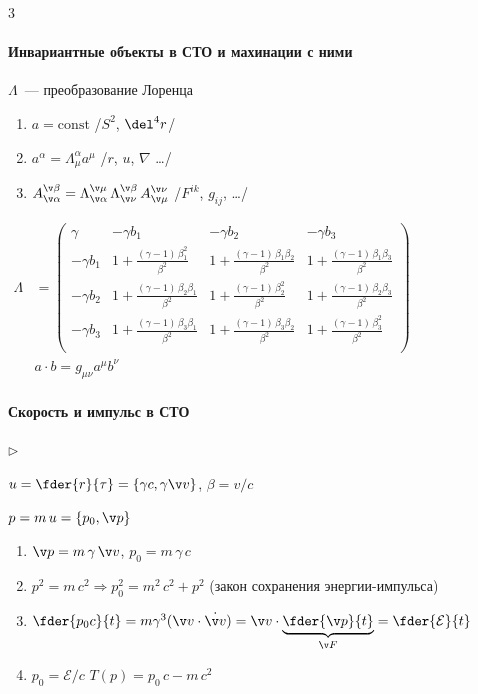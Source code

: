 \documentclass{trchesh}
\newenvironment{facts}{\begin{list}{$\triangleright$}{}}{\end{list}}
\begin{document}
\begin{multicols*}{3}
\paragraph{Инвариантные объекты в СТО и махинации с ними\underdev}
$\Lambda$~--- преобразование Лоренца
\begin{enumerate}
  \item $a = \mathrm{const}$ \hfill /$S^2$, $\del^4r$/
  \item $a^\alpha = \Lambda^\alpha_\mu a^\mu$ \hfill /$r$, $u$, $\nabla$ \dots/
  \item $A_{\v \alpha}^{\v \beta} = \Lambda_{\v \alpha}^{\v \mu} \, \Lambda_{\v \nu}^{\v \beta}\,
    A_{\v \mu}^{\v \nu}$ \hfill /$F^{ik}$, $g_{ij}$, \dots/
\end{enumerate}

\begin{small}
$\begin{aligned}
  \Lambda &= \begin{pmatrix}
   \gamma      & -\gamma b_1& -\gamma b_2& -\gamma b_3\\
   -\gamma b_1  & 1 + \tfrac{(\gamma-1)\,\beta_1^2}{\beta^2}  &
   1 + \tfrac{(\gamma-1)\,\beta_1\beta_2}{\beta^2} & 1 + \tfrac{(\gamma-1)\,\beta_1\beta_3}{\beta^2}\\
   -\gamma b_2  & 1 + \tfrac{(\gamma-1)\,\beta_2\beta_1}{\beta^2}  &
   1 + \tfrac{(\gamma-1)\,\beta_2^2}{\beta^2} & 1 + \tfrac{(\gamma-1)\,\beta_2\beta_3}{\beta^2}\\
   -\gamma b_3  & 1 + \tfrac{(\gamma-1)\,\beta_3\beta_1}{\beta^2}  &
   1 + \tfrac{(\gamma-1)\,\beta_3\beta_2}{\beta^2} & 1 + \tfrac{(\gamma-1)\,\beta_3^2}{\beta^2}\\
\end{pmatrix} \\
&a \cdot b = g_{\mu\nu} a^\mu b^\nu
\end{aligned}$
\end{small}


\paragraph{Скорость и импульс в СТО}

\begin{facts}
  \item $u = \fder{r}{\tau}  = \{\gamma c, \gamma \v v\}$, $\beta = v / c$
  \item $p = m \, u = \{p_0, \v p\}$
\end{facts}
\begin{enumerate}
\item $\v p = m \, \gamma \, \v v$, $p_0 = m \, \gamma \, c$
\item $p^2 = m\, c^2 \Rightarrow p_0^2 = m^2\,c^2 + p^2$ (закон сохранения энергии-импульса)
\item $\fder{p_0 c}{t} = m \gamma^3 (\v v \cdot \dot{\v v}) = 
  \v v \cdot \underbrace{\fder{\v p}{t}}_{\v F} = \fder{\mathcal E}{t}$
\item $p_0 = \mathcal E/c$  $T(p) = p_0\, c - m\,c^2$
\end{enumerate}


\end{multicols*}
\end{document}
